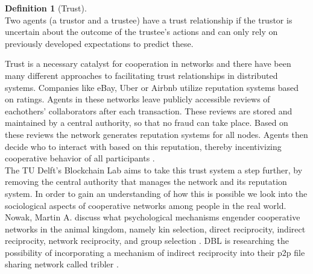 \documentclass[twocolumn]{article}
\theoremstyle{definition}
\newtheorem{definition}{Definition}[section]
\theoremstyle{theorem}
\begin{document}
\begin{definition}[Trust]\ \\
Two agents (a trustor and a trustee) have a trust relationship if the trustor is uncertain about the outcome of the trustee's actions and can only rely on previously developed expectations to predict these.
\end{definition}

\noindent Trust is a necessary catalyst for cooperation in networks and there have been many different approaches to facilitating trust relationships in distributed systems. Companies like eBay, Uber or Airbnb utilize reputation systems based on ratings. Agents in these networks leave publicly accessible reviews of eachothers' collaborators after each transaction. These reviews are stored and maintained by a central authority, so that no fraud can take place. Based on these reviews the network generates reputation systems for all nodes. Agents then decide who to interact with based on this reputation, thereby incentivizing cooperative behavior of all participants \cite{Reputation Systems}. \vspace{1em}\\

\noindent The TU Delft's Blockchain Lab aims to take this trust system a step further, by removing the central authority that manages the network and its reputation system. In order to gain an understanding of how this is possible we look into the sociological aspects of cooperative networks among people in the real world. Nowak, Martin A. discuss what psychological mechanisms engender cooperative networks in the animal kingdom, namely kin selection, direct reciprocity, indirect reciprocity, network reciprocity, and group selection \cite{Five Rules for the Evolution of Cooperation}. DBL is researching the possibility of incorporating a mechanism of indirect reciprocity into their p2p file sharing network called tribler \cite{TRIBLER:a social-based peer-to-peer system}.
\end{document}
